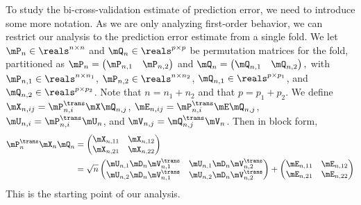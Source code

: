To study the bi-cross-validation estimate of prediction error, we need to 
introduce some more notation.  As we are only analyzing first-order 
behavior, we can restrict our analysis to the prediction error estimate from a 
single fold.  We let $\mP_n \in \reals^{n \times n}$ and 
$\mQ_n \in \reals^{p \times p}$ be permutation matrices for the fold, partitioned as
\(
    \mP_n 
        = 
        \left( 
        \begin{matrix}
            \mP_{n,1} & \mP_{n,2}
        \end{matrix}
        \right)
\)
and
\(
    \mQ_n
        =
        \left(
        \begin{matrix}
            \mQ_{n,1} & \mQ_{n,2}
        \end{matrix}
        \right),
\)
with $\mP_{n,1} \in \reals^{n \times n_1}$, $\mP_{n,2} \in \reals^{n \times n_2}$, $\mQ_{n,1} \in \reals^{p \times p_1}$, and $\mQ_{n,2} \in \reals^{p \times p_2}$.  Note that $n = n_1 + n_2$ and that $p = p_1 + p_2$.  We define
$\mX_{n,ij} = \mP_{n,i}^\trans \mX \mQ_{n,j}$,
$\mE_{n,ij} = \mP_{n,i}^\trans \mE \mQ_{n,j}$,
$\mU_{n,i} = \mP_{n,i}^\trans \mU_n$, and
$\mV_{n,j} = \mQ_{n,j}^\trans \mV_n$.  Then in block form,
\begin{align*}
    \mP_n^\trans \mX_n \mQ_n
        &=
            \left(
            \begin{matrix}
                \mX_{n,11} & \mX_{n,12} \\
                \mX_{n,21} & \mX_{n,22}
            \end{matrix}
            \right) \\
        &=
            \sqrt{n}
            \left(
            \begin{matrix}
                \mU_{n,1} \mD_n \mV_{n,1}^\trans &
                    \mU_{n,1} \mD_n \mV_{n,2}^\trans \\
                \mU_{n,2} \mD_n \mV_{n,1}^\trans &
                    \mU_{n,2} \mD_n \mV_{n,2}^\trans
            \end{matrix}
            \right)
            +
            \left(
            \begin{matrix}
                \mE_{n,11} & \mE_{n,12} \\
                \mE_{n,21} & \mE_{n,22}
            \end{matrix}
            \right)
\end{align*}
This is the starting point of our analysis.

